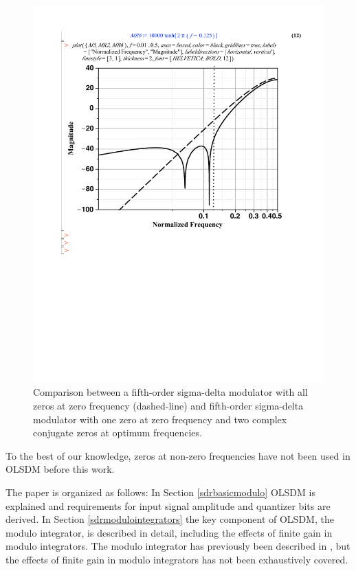 \begin{figure}[htbp]
\centerline{ \includegraphics[width=\myfigwidth]{graphics/f0zerof1}}
  \caption{Comparison between a fifth-order sigma-delta modulator with
  all zeros at zero frequency (dashed-line) and fifth-order
  sigma-delta modulator with one zero at zero
  frequency and two complex conjugate zeros at optimum frequencies.}
  \label{sdrfig:f0zerof1}
\end{figure}


To the best of our
knowledge, zeros at non-zero frequencies have not been used in OLSDM
before this work. 

The paper is organized as follows: In Section \ref{sdrbasicmodulo} 
OLSDM is explained and requirements for input signal amplitude and quantizer bits are
derived. In Section \ref{sdrmodulointegrators} the key component of OLSDM, the
modulo integrator, is described in detail, including the effects of
finite gain in modulo integrators. The modulo integrator has
previously been described in \cite{wulff08a}, but the effects of
finite gain in modulo integrators has not been exhaustively covered.

